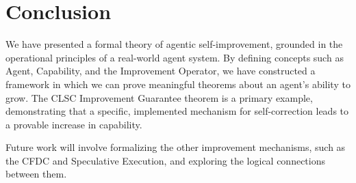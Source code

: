 \documentclass{article}
\begin{document}
\section{Conclusion}

We have presented a formal theory of agentic self-improvement, grounded in the operational principles of a real-world agent system. By defining concepts such as Agent, Capability, and the Improvement Operator, we have constructed a framework in which we can prove meaningful theorems about an agent's ability to grow. The CLSC Improvement Guarantee theorem is a primary example, demonstrating that a specific, implemented mechanism for self-correction leads to a provable increase in capability.

Future work will involve formalizing the other improvement mechanisms, such as the CFDC and Speculative Execution, and exploring the logical connections between them.
\end{document}
